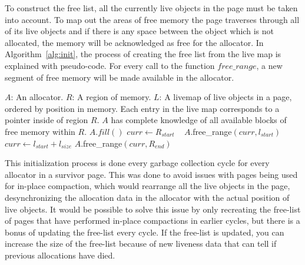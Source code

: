 To construct the free list, all the currently live objects in the page must be taken into account. To map out the areas of free memory the page traverses through all of its live objects and if there is any space between the object which is not allocated, the memory will be acknowledged as free for the allocator. In Algorithm~\ref{alg:init}, the process of creating the free list from the live map is explained with pseudo-code. For every call to the function $free\_range$, a new segment of free memory will be made available in the allocator. 

\begin{algorithm}[H]{}
      \caption{$(A,R,L)$}
      \label{alg:init}
      \begin{algorithmic}[1]
                \Require 
                \Statex $A$: An allocator.
                \Statex $R$: A region of memory.
                \Statex $L$: A livemap of live objects in a page, ordered by position in memory. Each entry in the live map corresponds to a pointer inside of region $R$. 
                \Ensure 
                \Statex $A$ has complete knowledge of all available blocks of free memory within $R$.
                \State $A.fill()$ 
                \State $curr\gets R_{start}$ 
                  
                \State $A$.free\_range$(curr, l_{start})$ 
                \EndIf
                \State $curr\gets l_{start} + l_{size}$ 
                \EndFor
                \State $A$.free\_range$(curr,R_{end})$ 
      \end{algorithmic}
\end{algorithm}

This initialization process is done every garbage collection cycle for every allocator in a survivor page. This was done to avoid issues with pages being used for in-place compaction, which would rearrange all the live objects in the page, desynchronizing the allocation data in the allocator with the actual position of live objects. It would be possible to solve this issue by only recreating the free-list of pages that have performed in-place compactions in earlier cycles, but there is a bonus of updating the free-list every cycle. If the free-list is updated, you can increase the size of the free-list because of new liveness data that can tell if previous allocations have died.

